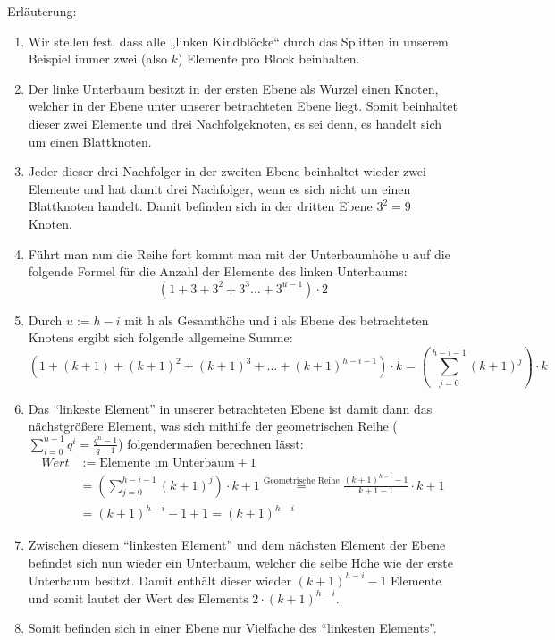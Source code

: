 \begin{enumerate}[a)]
\begin{solution}
Erläuterung:
\begin{enumerate}
\item Wir stellen fest, dass alle „linken Kindblöcke“ durch das Splitten in unserem Beispiel immer zwei (also $k$) Elemente pro Block beinhalten.
\item Der linke Unterbaum besitzt in der ersten Ebene als Wurzel einen Knoten, welcher in der Ebene unter unserer betrachteten Ebene liegt.
Somit beinhaltet dieser zwei Elemente und drei Nachfolgeknoten, es sei denn, es handelt sich um einen Blattknoten.
\item Jeder dieser drei Nachfolger in der zweiten Ebene beinhaltet wieder zwei Elemente und hat damit drei Nachfolger, wenn es sich nicht um einen Blattknoten handelt.
Damit befinden sich in der dritten Ebene $3^2 = 9$ Knoten.
\item Führt man nun die Reihe fort kommt man mit der Unterbaumhöhe u auf die folgende Formel für die Anzahl der Elemente des linken Unterbaums:
\[(1 + 3 +3^2 +3^3 \ldots + 3^{u-1}) \cdot 2\]
\item Durch $u:= h-i$ mit h als Gesamthöhe und i als Ebene des betrachteten Knotens ergibt sich folgende allgemeine Summe:
\[(1 + (k+1) + (k+1)^2 + (k+1)^3 + \ldots + (k+1)^{h-i-1}) \cdot k = \left(\sum_{j=0}^{h-i-1} (k+1)^j\right)\cdot k \]
\item Das "`linkeste Element"' in unserer betrachteten Ebene ist damit dann das nächstgrößere Element, was sich mithilfe der geometrischen Reihe ($\sum_{i=0}^{n-1}q^i = \frac{q^n - 1}{q - 1}$) folgendermaßen berechnen lässt:
\begin{align*}
Wert &:= \text{Elemente im Unterbaum} + 1\\
& = \left(\sum_{j=0}^{h-i-1} (k+1)^j\right)\cdot k +1 \stackrel{\text{Geometrische Reihe}}{=} \frac{(k+1)^{h-i}-1}{k + 1 - 1}\cdot k + 1\\
&= (k+1)^{h-i}- 1 +1 = (k+1)^{h-i}
\end{align*}
\item Zwischen diesem "`linkesten Element"' und dem nächsten Element der Ebene befindet sich nun wieder ein Unterbaum, welcher die selbe Höhe wie der erste Unterbaum besitzt.
Damit enthält dieser wieder $(k+1)^{h-i} - 1$ Elemente und somit lautet der Wert des Elements $2\cdot (k+1)^{h-i}$.
\item Somit befinden sich in einer Ebene nur Vielfache des "`linkesten Elements"'.
\end{enumerate}
\end{solution}


\end{enumerate}

